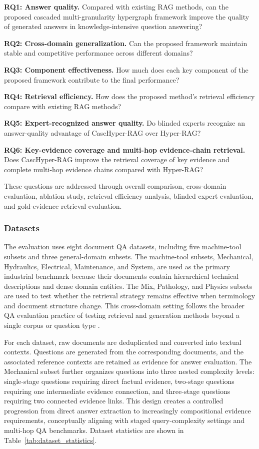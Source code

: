 \documentclass[a4paper,fleqn]{cas-dc}
\begin{document}
\textbf{RQ1: Answer quality.} Compared with existing RAG methods, can the proposed cascaded multi-granularity hypergraph framework improve the quality of generated answers in knowledge-intensive question answering?

\textbf{RQ2: Cross-domain generalization.} Can the proposed framework maintain stable and competitive performance across different domains?

\textbf{RQ3: Component effectiveness.} How much does each key component of the proposed framework contribute to the final performance?

\textbf{RQ4: Retrieval efficiency.} How does the proposed method's retrieval efficiency compare with existing RAG methods?

\textbf{RQ5: Expert-recognized answer quality.} Do blinded experts recognize an answer-quality advantage of CascHyper-RAG over Hyper-RAG?

\textbf{RQ6: Key-evidence coverage and multi-hop evidence-chain retrieval.} Does CascHyper-RAG improve the retrieval coverage of key evidence and complete multi-hop evidence chains compared with Hyper-RAG?

These questions are addressed through overall comparison, cross-domain evaluation, ablation study, retrieval efficiency analysis, blinded expert evaluation, and gold-evidence retrieval evaluation.
\subsubsection{Datasets}

The evaluation uses eight document QA datasets, including five machine-tool subsets and three general-domain subsets. The machine-tool subsets, Mechanical, Hydraulics, Electrical, Maintenance, and System, are used as the primary industrial benchmark because their documents contain hierarchical technical descriptions and dense domain entities. The Mix, Pathology, and Physics subsets are used to test whether the retrieval strategy remains effective when terminology and document structure change. This cross-domain setting follows the broader QA evaluation practice of testing retrieval and generation methods beyond a single corpus or question type \citep{Kwiatkowski2019NaturalQuestions}.

For each dataset, raw documents are deduplicated and converted into textual contexts. Questions are generated from the corresponding documents, and the associated reference contexts are retained as evidence for answer evaluation. The Mechanical subset further organizes questions into three nested complexity levels: single-stage questions requiring direct factual evidence, two-stage questions requiring one intermediate evidence connection, and three-stage questions requiring two connected evidence links. This design creates a controlled progression from direct answer extraction to increasingly compositional evidence requirements, conceptually aligning with staged query-complexity settings and multi-hop QA benchmarks. Dataset statistics are shown in Table~\ref{tab:dataset_statistics}.
\end{document}
